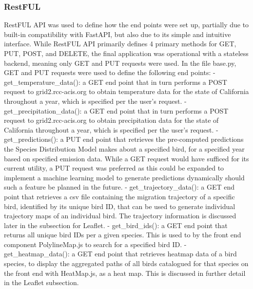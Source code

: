 \documentclass{article}
\begin{document}
\subsubsection*{RestFUL}
RestFUL API was used to define how the end points were set up, partially due to built-in compatibility with FastAPI, but also due to its simple and intuitive interface. While RestFUL API primarily defines 4 primary methods for GET, PUT, POST, and DELETE, the final application was operational with a stateless backend, meaning only GET and PUT requests were used.
In the file base.py, GET and PUT requests were used to define the following end points:
- get_temperature_data(): a GET end point that in turn performs a POST request to grid2.rcc-acis.org to obtain temperature data for the state of California throughout a year, which is specified per the user's request.
- get_precipitation_data(): a GET end point that in turn performs a POST request to grid2.rcc-acis.org to obtain precipitation data for the state of California throughout a year, which is specified per the user's request.
- get_predictions(): a PUT end point that retrieves the pre-computed predictions the Species Distribution Model makes about a specified bird, for a specified year based on specified emission data. While a GET request would have sufficed for its current utility, a PUT request was preferred as this could be expanded to implement a machine learning model to generate predictions dynamically should such a feature be planned in the future.
- get_trajectory_data(): a GET end point that retrieves a csv file containing the migration trajectory of a specific bird, identified by its unique bird ID, that can be used to generate individual trajectory maps of an individual bird. The trajectory information is discussed later in the subsection for Leaflet.
- get_bird_ids(): a GET end point that returns all unique bird IDs per a given species. This is used to by the front end component PolylineMap.js to search for a specified bird ID.
- get_heatmap_data(): a GET end point that retrieves heatmap data of a bird species, to display the aggregated paths of all birds catalogued for that species on the front end with HeatMap.js, as a heat map. This is discussed in further detail in the Leaflet subsection.
\end{document}
